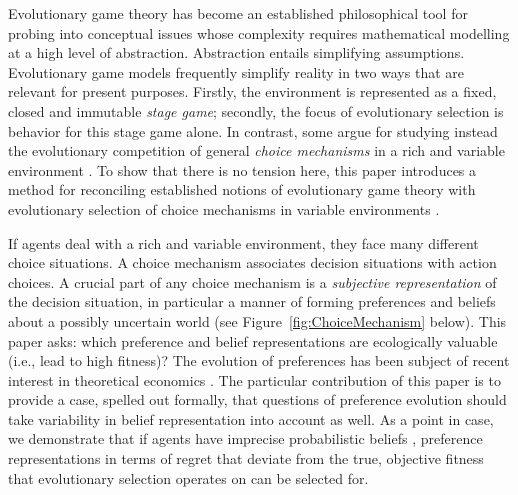\documentclass[fleqn,reqno,11pt]{article}
\begin{document}

Evolutionary game theory has become an established philosophical tool for probing into
conceptual issues whose complexity requires mathematical modelling at a high level of
abstraction.  Abstraction entails simplifying assumptions. Evolutionary game models frequently
simplify reality in two ways that are relevant for present purposes. Firstly, the environment
is represented as a fixed, closed and immutable \emph{stage game}; secondly, the focus of
evolutionary selection is behavior for this stage game alone. In contrast, some argue for
studying instead the evolutionary competition of general \emph{choice mechanisms} in a rich and
variable environment
\citep[e.g.,][]{FawcettHamblin2013:Exposing-the-be,McNamara2013:Towards-a-Riche}. To show that
there is no tension here, this paper introduces a method for reconciling established notions of
evolutionary game theory with evolutionary selection of choice mechanisms in variable
environments \citep[see related work
by][]{ZollmanSmead2010:Plasticity-and-,SmeadZollman2013:The-Stability-o}.

If agents deal with a rich and variable environment, they face many different choice
situations. A choice mechanism associates decision situations with action choices. A crucial
part of any choice mechanism is a \emph{subjective representation} of the decision situation,
in particular a manner of forming preferences and beliefs about a possibly uncertain world (see
Figure~\ref{fig:ChoiceMechanism} below). This paper asks: which preference and belief
representations are ecologically valuable (i.e., lead to high fitness)? The evolution of
preferences has been subject of recent interest in theoretical economics
\citep[e.g.,][]{algweib13,DekElyYlan07,RobSam11}. The particular contribution of this paper is
to provide a case, spelled out formally, that questions of preference evolution should take
variability in belief representation into account as well. As a point in case, we demonstrate
that if agents have imprecise probabilistic beliefs \citep[e.g.][]{gardsah82,levi74,walley96},
preference representations in terms of regret that deviate from the true, objective fitness
that evolutionary selection operates on can be selected for.
\end{document}
